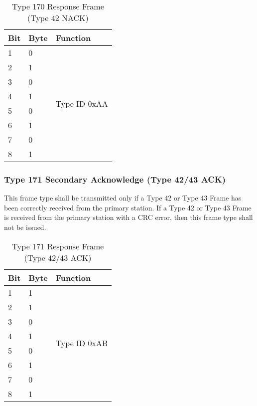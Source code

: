\documentclass[]{article}
\begin{document}
\begin{table}[ht]
	\centering
	\begin{tabular}{lll}
		\hline
		\textbf{Bit} & \textbf{Byte} & \textbf{Function}             \\ \hline
		1            & 0             & \multirow{8}{*}{Type ID 0xAA} \\
		2            & 1             &                               \\
		3            & 0             &                               \\
		4            & 1             &                               \\
		5            & 0             &                               \\
		6            & 1             &                               \\
		7            & 0             &                               \\
		8            & 1             &                               \\ \hline
	\end{tabular}
	\caption{Type 170 Response Frame (Type 42 NACK)}
	\label{tab:type-170-frame}
\end{table}

\clearpage

\subsubsection{Type 171 Secondary Acknowledge (Type 42/43 ACK)}
This frame type shall be transmitted only if a Type 42 or Type 43 Frame has been correctly received from
the primary station. If a Type 42 or Type 43 Frame is received from the primary station with a CRC error, then this frame type shall not be issued.

\begin{table}[ht]
	\centering
	\begin{tabular}{lll}
		\hline
		\textbf{Bit} & \textbf{Byte} & \textbf{Function}             \\ \hline
		1            & 1             & \multirow{8}{*}{Type ID 0xAB} \\
		2            & 1             &                               \\
		3            & 0             &                               \\
		4            & 1             &                               \\
		5            & 0             &                               \\
		6            & 1             &                               \\
		7            & 0             &                               \\
		8            & 1             &                               \\ \hline
	\end{tabular}
	\caption{Type 171 Response Frame (Type 42/43 ACK)}
	\label{tab:type-171-frame}
\end{table}
\end{document}
